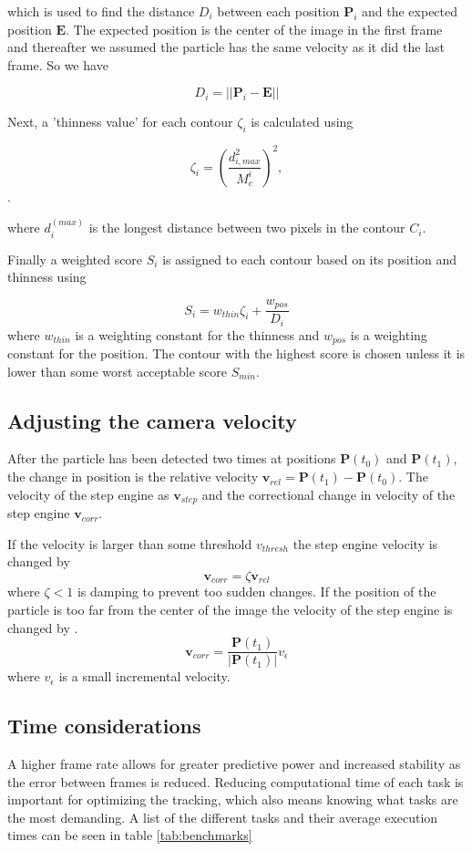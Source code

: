 \noindent which is used to find the distance $D_i$ between each position $\mathbf{P}_i$ and the expected position $\mathbf{E}$. The expected position is the center of the image in the first frame and thereafter we assumed the particle has the same velocity as it did the last frame. So we have 

\[
D_i = \left|\left|\mathbf{P}_i - \mathbf{E}\right|\right|
\]

\noindent Next, a 'thinness value' for each contour $\zeta_i$ is calculated using

\begin{equation}\label{eq:thinness}
\zeta_i =  \left(\frac{d_{i, max}^2}{M_c^i}\right)^2,
\end{equation}. 

\noindent where $d_i^{(max)}$ is the longest distance between two pixels in the contour $C_i$.

Finally a weighted score $S_i$ is assigned to each contour based on its position and thinness using

\begin{equation}
S_i = w_{thin}\zeta_i + \frac{w_{pos}}{D_i}
\end{equation}
\noindent where $w_{thin}$ is a weighting constant for the thinness and $w_{pos}$ is a weighting constant for the position. The contour with the highest score is chosen unless it is lower than some worst acceptable score $S_{min}$. 

\subsection{Adjusting the camera velocity}
After the particle has been detected two times at positions $\mathbf{P}(t_0)$ and $\mathbf{P}(t_1)$, the change in position is the relative velocity $\mathbf{v}_{rel} = \mathbf{P}(t_1) - \mathbf{P}(t_0)$.  The velocity of the step engine as $\mathbf{v}_{step}$ and the correctional change in velocity of the step engine $\mathbf{v}_{corr}$.

If the velocity is larger than some threshold $v_{thresh}$ the step engine velocity is changed by
\[
\mathbf{v}_{corr} = \zeta\mathbf{v}_{rel}
\]
where $\zeta < 1$ is damping to prevent too sudden changes. If the position of the particle is too far from the center of the image the velocity of the step engine is changed by .
\[
\mathbf{v}_{corr} = \frac{\mathbf{P}(t_1)}{\left|\mathbf{P}(t_1)\right|}v_{\epsilon}
\] 
where $v_{\epsilon}$ is a small incremental velocity.


\subsection{Time considerations}\label{sec:time considerations}
A higher frame rate allows for greater predictive power and increased stability as the error between frames is 
reduced. Reducing computational time of each task is important for optimizing the tracking, which also means knowing 
what tasks are the most demanding. A list of the different tasks and their average execution times can be seen in table 
\ref{tab:benchmarks}


